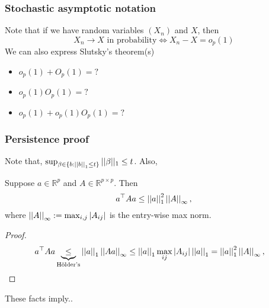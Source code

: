 \documentclass[12pt]{beamer}
\begin{document}
\begin{frame}
  \frametitle{Stochastic asymptotic notation}
Note that if we have random variables $(X_n)$ and $X$, then
\[
X_n \rightarrow X \textrm{ in probability} \Leftrightarrow X_n - X = o_p(1)
\]
We can also express Slutsky's theorem(s)
\vsp

\begin{itemize}
\item $o_p(1) + O_p(1) = ?$
\item $o_p(1) O_p(1) = ?$
\item $o_p(1) + o_p(1)O_p(1) = ?$
\end{itemize}
\end{frame}

\begin{frame}
  \frametitle{Persistence proof}
  Note that, $\sup_{\beta \in \{b: \left|\left| b \right|\right|_1 \leq t\}} ||\beta||_1 \leq t$.   Also, 
  \vsp
  
  \begin{lemma}
  \label{lem:quad-form} 
  Suppose $a \in \mathbb{R}^p$ and $A \in
  \mathbb{R}^{p \times p}$.  Then
  \begin{equation*} 
    a^\top A a 
    \leq \left|\left| a \right|\right|^2_{1}
    \left|\left| A \right|\right|_{\infty},
  \end{equation*}
  where $\left|\left| A \right|\right|_\infty:=\max_{i,j} |A_{ij}|$ is the entry-wise max norm.
\end{lemma}
 \begin{proof} 
   \begin{align*}
     a^\top A a & \underbrace{\leq}_{\textrm{H{\"o}lder's}} \left|\left| a \right|\right|_{1} \left|\left| A a \right|\right|_{\infty} 
      \leq \left|\left| a \right|\right|_{1} \max_{ij} |A_{ij}| \left|\left| a \right|\right|_1  
      = \left|\left| a \right|\right|^2_{1} \left|\left| A \right|\right|_{\infty},
   \end{align*}
 \end{proof}
These facts imply..
  \end{frame}
  
\end{document}
